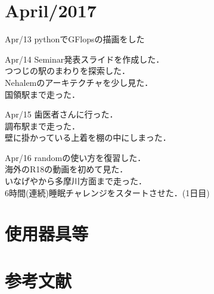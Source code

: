 \documentclass[11pt, a4paper]{jsarticle}
\begin{document}
\tableofcontents %
\newpage

\section{April/2017}
\begin{itembox}[r]{Apr/13}
	pythonでGFlopsの描画をした
\end{itembox}

\begin{itembox}[r]{Apr/14}
	Seminar発表スライドを作成した．\\
	つつじの駅のまわりを探索した．\\
	Nehalemのアーキテクチャを少し見た．\\
	国領駅まで走った．
\end{itembox}

\begin{itembox}[r]{Apr/15}
	歯医者さんに行った．\\
	調布駅まで走った．\\
	壁に掛かっている上着を棚の中にしまった．
\end{itembox}

\begin{itembox}[r]{Apr/16}
	randomの使い方を復習した．\\
	海外のR18の動画を初めて見た．\\
	いなげやから多摩川方面まで走った．\\
	6時間(連続)睡眠チャレンジをスタートさせた．(1日目)
\end{itembox}


\section{使用器具等}
\section{参考文献}
\end{document}
